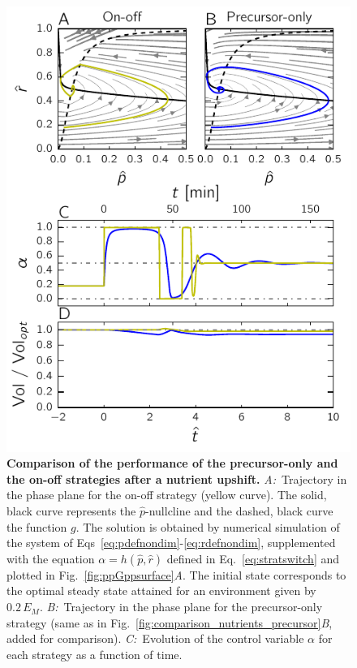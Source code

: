 \begin{figure}[p]
\centering
\includegraphics[scale=1]{./Fig/Fig7}
\caption{\small
\textbf{Comparison of the performance of the precursor-only and the on-off strategies after a nutrient upshift.}
\textit{A:}~Trajectory in the phase plane for the on-off strategy (yellow curve).
The solid, black curve represents the $\hat{p}$-nullcline and the dashed, black curve the function $g$.
The solution is obtained by numerical simulation of the system of Eqs~\ref{eq:pdefnondim}-\ref{eq:rdefnondim}, supplemented with the equation $\alpha = h(\hat{p},\hat{r})$ defined in Eq.~\ref{eq:stratswitch} and plotted in Fig.~\ref{fig:ppGppsurface}\textit{A}.
The initial state corresponds to the optimal steady state attained for an environment given by $0.2 \, E_M$.
\textit{B:}~Trajectory in the phase plane for the precursor-only strategy (same as in Fig.~\ref{fig:comparison_nutrients_precursor}\textit{B}, added for comparison).
\textit{C:}~Evolution of the control variable $\alpha$ for each strategy as a function of time.
}
\end{figure}
